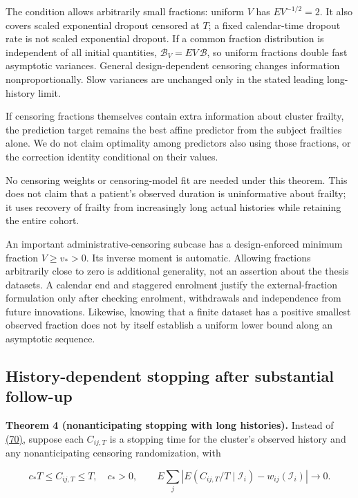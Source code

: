 \documentclass[11pt]{article}
\begin{document}
The condition allows arbitrarily small fractions: uniform \(V\) has \(EV^{-1/2}=2\). It also covers scaled exponential dropout censored at \(T\); a fixed calendar-time dropout rate is not scaled exponential dropout. If a common fraction distribution is independent of all initial quantities, \(\mathcal B_V=EV\,\mathcal B\), so uniform fractions double fast asymptotic variances. General design-dependent censoring changes information nonproportionally. Slow variances are unchanged only in the stated leading long-history limit.

If censoring fractions themselves contain extra information about cluster frailty, the prediction target remains the best affine predictor from the subject frailties alone. We do not claim optimality among predictors also using those fractions, or the correction identity conditional on their values.

No censoring weights or censoring-model fit are needed under this theorem. This does not claim that a patient's observed duration is uninformative about frailty; it uses recovery of frailty from increasingly long actual histories while retaining the entire cohort.

An important administrative-censoring subcase has a design-enforced minimum fraction \(V\ge v_*>0\). Its inverse moment is automatic. Allowing fractions arbitrarily close to zero is additional generality, not an assertion about the thesis datasets. A calendar end and staggered enrolment justify the external-fraction formulation only after checking enrolment, withdrawals and independence from future innovations. Likewise, knowing that a finite dataset has a positive smallest observed fraction does not by itself establish a uniform lower bound along an asymptotic sequence.

\subsection{History-dependent stopping after substantial follow-up}\label{sec:5.4}

\label{res:Theorem-4}
\textbf{Theorem 4 (nonanticipating stopping with long histories).} Instead of \hyperref[eq:70]{(70)}, suppose each \(C_{ij,T}\) is a stopping time for the cluster's observed history and any nonanticipating censoring randomization, with

\begin{equation*}
c_*T\leq C_{ij,T}\leq T,\quad c_*>0,\qquad
E\sum_j\left|E(C_{ij,T}/T\mid\mathcal I_i)-w_{ij}(\mathcal I_i)\right|\longrightarrow0 .
\tag{72}\label{eq:72}
\end{equation*}
\end{document}
